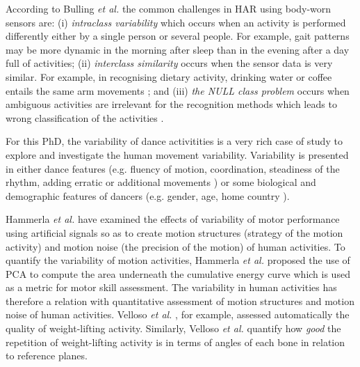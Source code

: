 \documentclass[10pt,journal,compsoc]{IEEEtran}
\begin{document}
According to Bulling \emph{et al.}  \cite{bulling2014} the common challenges in HAR
using body-worn sensors are: 
(i) \textit{intraclass variability} which occurs when an activity is performed differently 
either by a single person or several people. For example, gait patterns may be more
dynamic in the morning after sleep than in the evening after a day full of activities; 
(ii) \textit{interclass similarity} occurs when the sensor data is very similar. For example,
in recognising dietary activity, drinking water or coffee entails the same arm movements 
\cite{amft2008phd};
and (iii) \textit{the NULL class problem} occurs 
when ambiguous activities are irrelevant for the recognition methods
which leads to wrong classification of the activities \cite{amft2011}.

For this PhD, the variability of dance activitities is a very rich case of study 
to explore and investigate the human movement variability.
Variability is presented in either dance features 
(e.g. fluency of motion, coordination, steadiness of the rhythm, 
adding erratic or additional movements \cite{Grammer2011, Aristidou2014}) 
or some biological and demographic features of dancers 
(e.g. gender, age, home country \cite{Grammer2011, Iwai2011}). 

Hammerla \emph{et al.} \cite{hammerla2011} have examined the effects of
variability of motor performance using artificial signals so as to create 
motion structures (strategy of the motion activity) and motion noise 
(the precision of the motion) of human activities. 
To quantify the variability of motion activities, Hammerla \emph{et al.} 
\cite{hammerla2011} proposed the use of PCA to compute the area underneath 
the cumulative energy curve which is used as a metric for motor skill assessment.
The variability in human activities has therefore a relation with quantitative assessment
of motion structures and motion noise of human activities.
Velloso \emph{et al.} \cite{Velloso2013a}, for example, assessed automatically the quality 
of weight-lifting activity.
Similarly, Velloso \emph{et al.} \cite{Velloso2013b} quantify how \textit{good} the repetition of 
weight-lifting activity is in terms of angles of each bone in relation to reference planes. 
\end{document}
